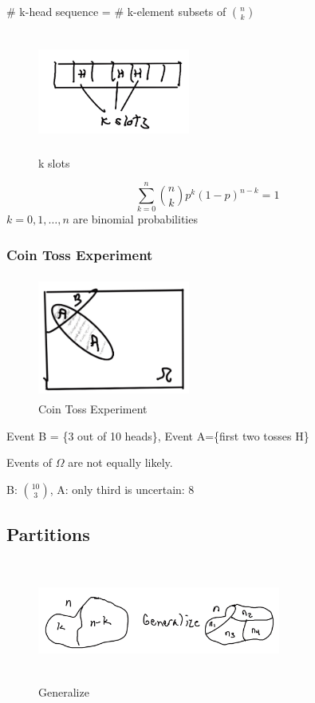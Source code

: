 
\# k-head sequence = \# k-element subsets of ${n \choose k}$

\begin{figure}[h]
\centering
\includegraphics[width=5cm, height=4cm]{images/L04/k_slots.jpeg}
\caption{k slots}
\end{figure}

$$
\sum_{k=0}^{n} {n \choose k} p^k(1-p)^{n-k}=1
$$
$k=0,1,\ldots,n$ are binomial probabilities

\subsubsection{Coin Toss Experiment}

\begin{figure}[h]
\centering
\includegraphics[width=5cm, height=4cm]{images/L04/coin_toss_exp.jpeg}
\caption{Coin Toss Experiment}
\end{figure}

Event B = \{3 out of 10 heads\}, Event A=\{first two tosses H\}

Events of $\Omega$ are not equally likely.

B: ${10 \choose 3}$, A: only third is uncertain: 8

\subsection{Partitions}


\begin{figure}[h]
\centering
\includegraphics[width=8cm, height=4cm]{images/L04/generalize.jpeg}
\caption{Generalize}
\end{figure}

